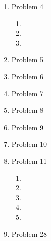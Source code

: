 \begin{enumerate}[leftmargin=2cm,labelsep=.5cm,label=\bf\arabic*.]

\item Problem 4
\begin{enumerate}
  \item
  \item
  \item
\end{enumerate}

\item Problem 5

\item Problem 6

\item Problem 7

\item Problem 8

\item Problem 9

\item Problem 10

\item Problem 11
\begin{enumerate}
  \item
  \item
  \item
  \item
  \item
\end{enumerate}

\item Problem 28

\end{enumerate}